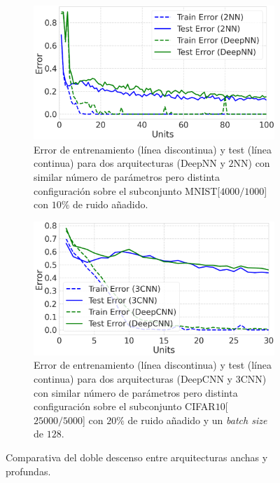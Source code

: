 \begin{figure}[htbp]
    \centering
    \begin{subfigure}[b]{0.47\textwidth}
        \centering
        \includegraphics[width=\textwidth]{img/experiments/2nnvsdeepnn.png}
        \caption{Error de entrenamiento (línea discontinua) y test (línea continua) para dos arquitecturas (DeepNN y $2$NN) con similar número de parámetros pero distinta configuración sobre el subconjunto MNIST[$4000/1000$] con $10\%$ de ruido añadido.}\label{fig:2nnvsdeepnn}
    \end{subfigure}
    \hfill 
    \begin{subfigure}[b]{0.47\textwidth} 
        \centering
        \includegraphics[width=\textwidth]{img/experiments/3cnnvsdeepcnn.png}
        \caption{Error de entrenamiento (línea discontinua) y test (línea continua) para dos arquitecturas (DeepCNN y $3$CNN) con similar número de parámetros pero distinta configuración sobre el subconjunto CIFAR$10$[$25000/5000$] con $20\%$ de ruido añadido y un \textit{batch size} de $128$.}\label{fig:3cnnvsdeepcnn}
    \end{subfigure}
    
    \caption[Comparativa del doble descenso entre arquitecturas anchas y profundas.]{Comparativa del doble descenso entre arquitecturas anchas y profundas.}\label{fig:width-depth}
\end{figure}

